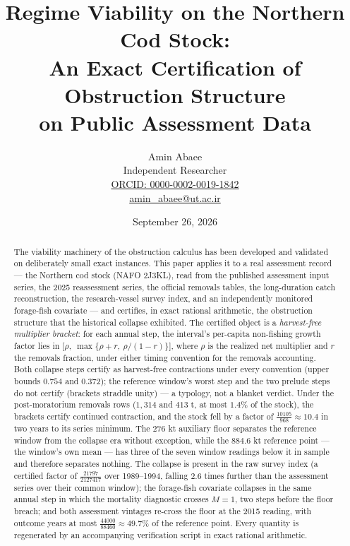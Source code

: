 \documentclass[10pt,twocolumn]{article}
\theoremstyle{plain}
\theoremstyle{remark}
\begin{document}
\title{Regime Viability on the Northern Cod Stock:\\
An Exact Certification of Obstruction Structure\\
on Public Assessment Data}
\author{Amin Abaee\\[0.35em]
{\small Independent Researcher}\\[0.55em]
{\small\href{https://orcid.org/0000-0002-0019-1842}{ORCID: 0000-0002-0019-1842}}\\[0.3em]
{\small\href{mailto:amin\_abaee@ut.ac.ir}{amin\_abaee@ut.ac.ir}}}
\date{September 26, 2026}
\maketitle

\begin{abstract}
The viability machinery of the obstruction calculus has been developed
and validated on deliberately small exact instances. This paper applies
it to a real assessment record --- the Northern cod stock (NAFO 2J3KL),
read from the published assessment input series, the 2025 reassessment
series, the official removals tables, the long-duration catch
reconstruction, the research-vessel survey index, and an independently
monitored forage-fish covariate --- and certifies, in exact rational
arithmetic, the obstruction structure that the historical collapse
exhibited. The certified object is a \emph{harvest-free multiplier
bracket}: for each annual step, the interval's per-capita non-fishing
growth factor lies in
\(\bigl[\rho,\ \max\{\rho+r,\ \rho/(1-r)\}\bigr]\), where \(\rho\) is
the realized net multiplier and \(r\) the removals fraction, under
either timing convention for the removals accounting. Both collapse
steps certify as harvest-free contractions under every convention
(upper bounds \(0.754\) and \(0.372\)); the reference window's worst
step and the two prelude steps do not certify (brackets straddle
unity) --- a typology, not a blanket verdict. Under the post-moratorium
removals rows (\(1{,}314\) and \(413\) t, at most \(1.4\%\) of the
stock), the brackets certify continued contraction, and the stock fell
by a factor of \(\tfrac{10105}{968} \approx 10.4\) in two years to its
series minimum. The \(276\) kt auxiliary floor separates the reference
window from the collapse era without exception, while the
\(884.6\) kt reference point --- the window's own mean --- has three of
the seven window readings below it in sample and therefore separates
nothing. The collapse is present in the raw survey index (a certified
factor of \(\tfrac{21797}{2127417}\) over 1989--1994, falling \(2.6\)
times further than the assessment series over their common window);
the forage-fish covariate collapses in the same annual step in which
the mortality diagnostic crosses \(M=1\), two steps before the floor
breach; and both assessment vintages re-cross the floor at the 2015
reading, with outcome years at most
\(\tfrac{44000}{88460} \approx 49.7\%\) of the reference point. Every
quantity is regenerated by an accompanying verification script in
exact rational arithmetic.
\end{abstract}
\end{document}
